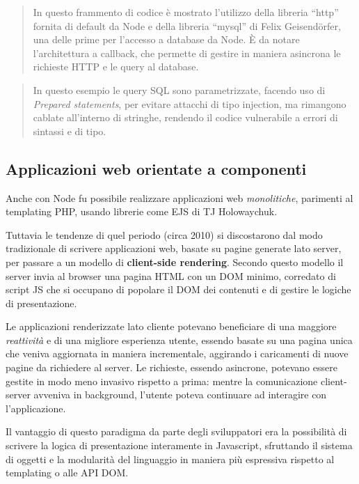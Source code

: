 \begin{quote}
In questo frammento di codice è mostrato l'utilizzo della libreria
``http'' fornita di default da Node e della libreria ``mysql'' di Felix
Geisendörfer, una delle prime per l'accesso a database da Node. È da
notare l'architettura a callback, che permette di gestire in maniera
asincrona le richieste HTTP e le query al database.
\end{quote}

\begin{quote}
In questo esempio le query SQL sono parametrizzate, facendo uso di
\emph{Prepared statements}, per evitare attacchi di tipo injection, ma
rimangono cablate all'interno di stringhe, rendendo il codice
vulnerabile a errori di sintassi e di tipo.
\end{quote}

\subsection{Applicazioni web orientate a
componenti}\label{applicazioni-web-orientate-a-componenti}

Anche con Node fu possibile realizzare applicazioni web
\emph{monolitiche}, parimenti al templating PHP, usando librerie come
EJS di TJ Holowaychuk.

Tuttavia le tendenze di quel periodo (circa 2010) si discostarono dal
modo tradizionale di scrivere applicazioni web, basate su pagine
generate lato server, per passare a un modello di \textbf{client-side
rendering}. Secondo questo modello il server invia al browser una pagina
HTML con un DOM minimo, corredato di script JS che si occupano di
popolare il DOM dei contenuti e di gestire le logiche di presentazione.

Le applicazioni renderizzate lato cliente potevano beneficiare di una
maggiore \emph{reattività} e di una migliore esperienza utente, essendo
basate su una pagina unica che veniva aggiornata in maniera
incrementale, aggirando i caricamenti di nuove pagine da richiedere al
server. Le richieste, essendo asincrone, potevano essere gestite in modo
meno invasivo rispetto a prima: mentre la comunicazione client-server
avveniva in background, l'utente poteva continuare ad interagire con
l'applicazione.

Il vantaggio di questo paradigma da parte degli sviluppatori era la
possibilità di scrivere la logica di presentazione interamente in
Javascript, sfruttando il sistema di oggetti e la modularità del
linguaggio in maniera più espressiva rispetto al templating o alle API
DOM.


